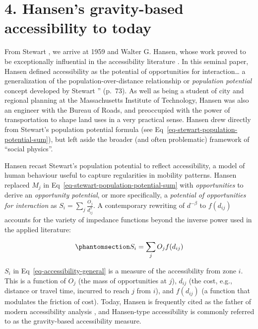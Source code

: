 \documentclass[
  10pt,
  letterpaper,
]{article}
\begin{document}
\section{4. Hansen's gravity-based accessibility to
today}\label{grav-to-today}

From Stewart \citep{stewartDemographicGravitationEvidence1948}, we
arrive at 1959 and Walter G. Hansen, whose work proved to be
exceptionally influential in the accessibility literature
\citep{hansen1959}. In this seminal paper, Hansen defined accessibility
as the potential of opportunities for interaction\ldots{} a
generalization of the population-over-distance relationship or
\emph{population potential} concept developed by Stewart
\citep{stewartDemographicGravitationEvidence1948}'' (p.~73). As well as
being a student of city and regional planning at the Massachusetts
Institute of Technology, Hansen was also an engineer with the Bureau of
Roads, and preoccupied with the power of transportation to shape land
uses in a very practical sense. Hansen \citep{hansen1959} drew directly
from Stewart's population potential formula (see
Eq~\ref{eq-stewart-population-potential-sum}), but left aside the
broader (and often problematic) framework of ``social physics''.

Hansen recast Stewart's population potential to reflect accessibility, a
model of human behaviour useful to capture regularities in mobility
patterns. Hansen replaced \(M_j\) in
Eq~\ref{eq-stewart-population-potential-sum} with \emph{opportunities}
to derive an \emph{opportunity potential}, or more specifically, a
\emph{potential of opportunities for interaction} as
\(S_{i} = \sum_j \frac{O_j }{d_{ij}^\beta}\). A contemporary rewriting
of \(d^{-\beta}\) to \(f(d_{ij})\) accounts for the variety of impedance
functions beyond the inverse power used in the applied literature:

\begin{equation}\phantomsection\label{eq-accessibility-general}{
S_{i} = \sum_j O_j  f(d_{ij})
}\end{equation}

\(S_{i}\) in Eq~\ref{eq-accessibility-general} is a measure of the
accessibility from zone \(i\). This is a function of \(O_j\) (the mass
of opportunities at \(j\)), \(d_{ij}\) (the cost, e.g., distance or
travel time, incurred to reach \(j\) from \(i\)), and \(f(d_{ij})\) (a
function that modulates the friction of cost). Today, Hansen is
frequently cited as the father of modern accessibility analysis
\citep[e.g.,][]{reggianiGuestEditorialNew2011}, and Hansen-type
accessibility is commonly referred to as the gravity-based accessibility
measure.
\end{document}
